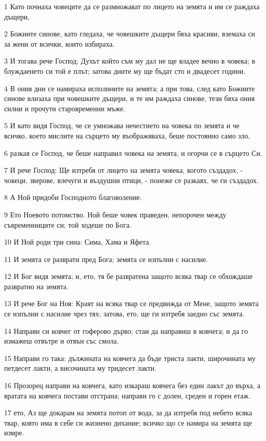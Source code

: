 \par 1 Като почнаха човеците да се размножават по лицето на земята и им се раждаха дъщери,
\par 2 Божиите синове, като гледаха, че човешките дъщери бяха красиви, вземаха си за жени от всички, които избираха.
\par 3 И тогава рече Господ; Духът който съм му дал не ще владее вечно в човека; в блуждаенето си той е плът; затова дните му ще бъдат сто и двадесет години.
\par 4 В ония дни се намираха исполините на земята; а при това, след като Божиите синове влизаха при човешките дъщери, и те им раждаха синове, тези бяха ония силни и прочути старовременни мъже.
\par 5 И като видя Господ, че се умножава нечестието на човека по земята и че всичко, което мислите на сърцето му въображяваха, беше постоянно само зло,
\par 6 разкая се Господ, че беше направил човека на земята, и огорчи се в сърцето Си.
\par 7 И рече Господ: Ще изтребя от лицето на земята човека, когото създадох, - човеци, зверове, влечуги и въздушни птици, - понеже се разкаях, че ги създадох.
\par 8 А Ной придоби Господното благоволение.
\par 9 Ето Ноевото потомство. Ной беше човек праведен, непорочен между съвременниците си; той ходеше по Бога.
\par 10 И Ной роди три сина: Сима, Хама и Яфета.
\par 11 И земята се разврати пред Бога; земята се изпълни с насилие.
\par 12 И Бог видя земята; и, ето, тя бе развратена защото всяка твар се обхождаше развратно на земята.
\par 13 И рече Бог на Ноя: Краят на всяка твар се предвижда от Мене, защото земята се изпълни с насилие чрез тях; затова, ето, ще ги изтребя заедно със земята.
\par 14 Направи си ковчег от гоферово дърво; стаи да направиш в ковчега; и да го измажеш отвътре и отвън със смола.
\par 15 Направи го така: дължината на ковчега да бъде триста лакти, широчината му петдесет лакти, а височината му тридесет лакти.
\par 16 Прозорец направи на ковчега, като изкараш ковчега без един лакът до върха, а вратата на ковчега постави отстрана; направи го с долен, среден и горен етаж.
\par 17 ето, Аз ще докарам на земята потоп от вода, за да изтребя под небето всяка твар, която има в себе си жизнено дихание; всичко що се намира на земята ще измре.
